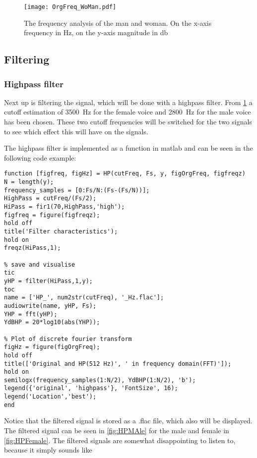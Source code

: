 \begin{figure}[h]
	\centering
	\texttt{[image: OrgFreq\_WoMan.pdf]}
	\caption{The frequency analysis of the man and woman. On the x-axis frequency in \si{\hertz}, on the y-axis magnitude in \si{\decibel}}
	\label{fig:WoManFFT}
\end{figure}

\subsection{Filtering}

\subsubsection{Highpass filter}
Next up is filtering the signal, which will be done with a highpass filter. From \cref{fig:WoManFFT} a cutoff estimation of \SI{3500}{\hertz} for the female voice and \SI{2800}{\hertz} for the male voice has been chosen. These two cutoff frequencies will be switched for the two signals to see which effect this will have on the signals.

The highpass filter is implemented as a function in matlab and can be seen in the following code example:

\begin{verbatim}
function [figfreq, figHz] = HP(cutFreq, Fs, y, figOrgFreq, figfreqz)
N = length(y);
frequency_samples = [0:Fs/N:(Fs-(Fs/N))];
HighPass = cutFreq/(Fs/2);
HiPass = fir1(70,HighPass,'high');
figfreq = figure(figfreqz);
hold off
title('Filter characteristics');
hold on
freqz(HiPass,1);

% save and visualise 
tic
yHP = filter(HiPass,1,y);
toc
name = ['HP_', num2str(cutFreq), '_Hz.flac'];
audiowrite(name, yHP, Fs);
YHP = fft(yHP);
YdBHP = 20*log10(abs(YHP));

% Plot of discrete fourier transform
figHz = figure(figOrgFreq);
hold off
title(['Original and HP(512 Hz)', ' in frequency domain(FFT)']);
hold on
semilogx(frequency_samples(1:N/2), YdBHP(1:N/2), 'b');
legend({'original', 'highpass'}, 'FontSize', 16);
legend('Location','best');
end
\end{verbatim}

Notice that the filtered signal is stored as a .flac file, which also will be displayed. The filtered signal can be seen in \cref{fig:HPMAle} for the male and female in \cref{fig:HPFemale}. The filtered signals are somewhat disappointing to listen to, because it simply sounds like 

